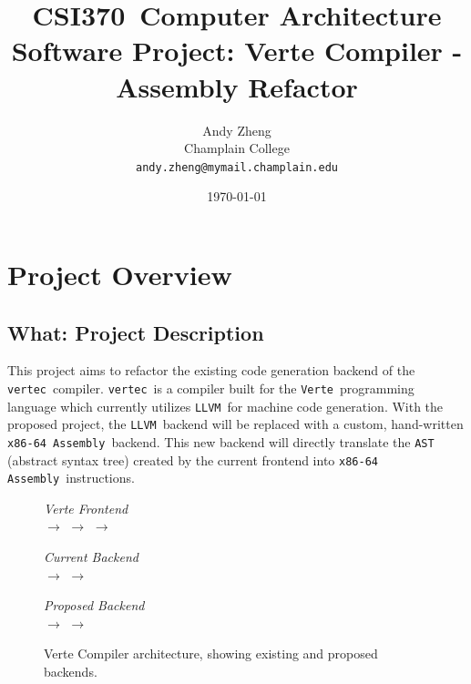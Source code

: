 \documentclass[11pt]{article}
\makeatletter
\newcommand{\coursecode}{CSI370}
\newcommand{\coursetitle}{Computer Architecture}
\newcommand{\assignmenttitle}{Software Project: Verte Compiler - Assembly Refactor}
\newcommand{\authorname}{Andy Zheng}
\newcommand{\authoremail}{andy.zheng@mymail.champlain.edu}
\newcommand{\institution}{Champlain College}
\newcommand{\code}[1]{\texttt{#1}}
\newcommand{\verte}{\texttt{Verte}}
\newcommand{\vertec}{\texttt{vertec}}
\newcommand{\llvm}{\texttt{LLVM}}
\newcommand{\asm}{\texttt{x86-64 Assembly}}
\makeatother
\begin{document}
\title{\coursecode\ \coursetitle \\ \vspace{0.5em} \Large \assignmenttitle}

\author{
	\authorname \\
	\small \institution \\
	\small \texttt{\authoremail}
	\date{\today}
}

\maketitle
\thispagestyle{plain}

\section{Project Overview}
\label{sec:overview}

\subsection{What: Project Description}
\label{subsec:what}
This project aims to refactor the existing code generation backend of the \vertec\ compiler.
\vertec\ is a compiler built for the \verte\ programming language which currently utilizes \llvm\ for machine code generation.
With the proposed project, the \llvm\ backend will be replaced with a custom, hand-written \asm\ backend. 
This new backend will directly translate the \code{AST} (abstract syntax tree) created by the current frontend into \asm\ instructions.

\begin{figure}[h]
	\centering
	\small
	\setlength{\fboxsep}{6pt}
	\setlength{\fboxrule}{0.5pt}

	\textit{Verte Frontend}\\[0.4em]
	$\rightarrow$
	$\rightarrow$
	$\rightarrow$
	\vspace{1.2em}

	\textit{Current Backend}\\[0.4em]
	$\rightarrow$
	$\rightarrow$
	\vspace{1.5em}

	\textit{Proposed Backend}\\[0.4em]
	$\rightarrow$
	$\rightarrow$
	\vspace{1.2em}

	\caption{Verte Compiler architecture, showing existing and proposed backends.}
	\label{fig:architecture}
\end{figure}
\end{document}
